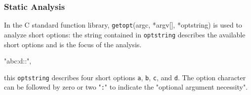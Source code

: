 \subsubsection{Static Analysis} %
\label{subsec:optana-static}

In the C standard function library, \texttt{getopt}(argc, *argv[], *optstring) is used to analyze short options: the string contained in \texttt{optstring} describes the available short options and is the focus of the analysis.

\iffalse
\begin{lstlisting}[numbers=none]
"abc:d::"
\end{lstlisting}
\else
"abc:d::",
\fi
this \texttt{optstring} describes four short options \texttt{a}, \texttt{b}, \texttt{c}, and \texttt{d}. The option character can be followed by zero or two "\texttt{:}" to indicate the "optional argument necessity".

